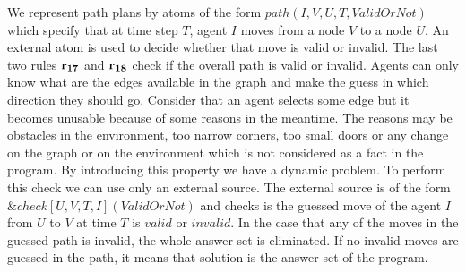 \documentclass[a4paper, titlepage]{article}
\newcommand{\ext}[3]{\ensuremath{\&{#1}[#2](#3)}}
\newcommand{\row}[1]{%
  \ensuremath{\color{black}\ensuremath{\mathbf{#1}} \color{black}}%
}
\begin{document}
We represent path plans by atoms of the form 
$\mathit{path(I, V, U, T, ValidOrNot)}$ which specify that 
at time step $T$, agent $I$ moves from a node $V$ to a 
node $U$. An external atom is used to decide whether that move is valid or invalid. The last 
two rules $\row{r_{17}}$ and $\row{r_{18}}$ check if the overall path is valid or invalid. Agents can only know what are the edges 
available in the graph and make the guess in which 
direction they should go. Consider that an agent selects 
some 
edge but it becomes unusable because of some reasons in the meantime. 
The reasons may be obstacles in the environment, too narrow corners, too small doors or any change on 
the graph or on the environment which is not considered as 
a fact in the program. By introducing this property we have a dynamic problem. To perform this check we 
can use only an external source. The external source is of the 
form \ext{check}{U,V,T,I}{ValidOrNot} and checks is the 
guessed move of the agent $I$ from $U$ to $V$ at time $T$ is 
$\mathit{valid}$ or $\mathit{invalid}$. In the case that 
any of the moves in the guessed path is invalid, the whole 
answer set is eliminated. If no invalid moves are guessed in the path, it means that solution is the answer set of the program.            
\end{document}
